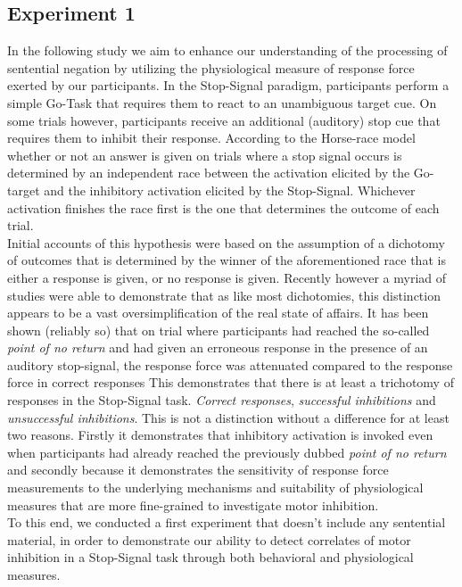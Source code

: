 \subsection{Experiment 1}
\label{sub:experiment_1}
In the following study we aim to enhance our understanding of the processing
of sentential negation by utilizing the physiological measure of response
force exerted by our participants. In the Stop-Signal paradigm, participants
perform a simple Go-Task that requires them to react to an unambiguous target
cue. On some trials however, participants receive an additional (auditory)
stop cue that requires them to inhibit their response. According to the
Horse-race model \parencite[][]{logan_ability_1984, logan_ability_1984-1, band_horse-race_2003}
whether or not an answer is given on trials where a stop signal
occurs is determined by an independent race between the activation elicited by
the Go-target and the inhibitory activation elicited by the Stop-Signal.
Whichever activation finishes the race first is the one that determines the
outcome of each trial.\\

Initial accounts of this hypothesis were based on the assumption of a
dichotomy of outcomes that is determined by the winner of the aforementioned
race that is either a response is given, or no response is given. Recently
however a myriad of studies were able to demonstrate that as like most
dichotomies, this distinction appears to be a vast oversimplification of
the real state of affairs. It has been shown (reliably so) that on trial
where participants had reached the so-called \textit{point of no return} and
had given an erroneous response in the presence of an auditory stop-signal,
the response force was attenuated compared to the response force in correct
responses \parencite[][]{ko_inhibitory_2012, nguyen_go_2021,
	nguyen_motor_2020, weber_stopping_2024, wang_unravelling_2023,
	weissman_proactive_2024, salomoni_proactive_2023}
This demonstrates that there is at least a trichotomy of responses in the
Stop-Signal task. \textit{Correct
	responses}, \textit{successful inhibitions} and \textit{unsuccessful inhibitions}.
This is not a distinction without a difference for at least two reasons.
Firstly it demonstrates that inhibitory activation is invoked even when
participants had already reached the previously dubbed \textit{point of no return} and
secondly
because it demonstrates the sensitivity of response force measurements to the
underlying mechanisms and suitability of physiological measures that are
more fine-grained to investigate motor inhibition.\\

To this end, we conducted a first experiment that doesn't include any
sentential material, in order to demonstrate our ability to detect correlates
of motor inhibition in a Stop-Signal task through both behavioral and
physiological measures.
